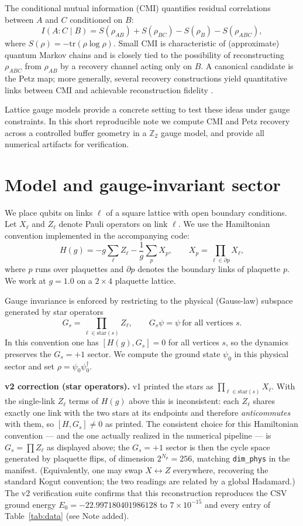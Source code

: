 \documentclass[11pt]{article}
\begin{document}
The conditional mutual information (CMI) quantifies residual
correlations between $A$ and $C$ conditioned on $B$:
\[
I(A : C \mid B) = S(\rho_{AB}) + S(\rho_{BC}) - S(\rho_B) -
S(\rho_{ABC}),
\]
where $S(\rho) = -\mathrm{tr}(\rho\log\rho)$. Small CMI is
characteristic of (approximate) quantum Markov chains and is closely
tied to the possibility of reconstructing $\rho_{ABC}$ from $\rho_{AB}$
by a recovery channel acting only on $B$. A canonical candidate is the
Petz map; more generally, several recovery constructions yield
quantitative links between CMI and achievable reconstruction fidelity
\cite{Petz, FR, SBT}.

Lattice gauge models provide a concrete setting to test these ideas
under gauge constraints. In this short reproducible note we compute CMI
and Petz recovery across a controlled buffer geometry in a
$\mathbb{Z}_2$ gauge model, and provide all numerical artifacts for
verification.

\section{Model and gauge-invariant sector}

We place qubits on links $\ell$ of a square lattice with open boundary
conditions. Let $X_\ell$ and $Z_\ell$ denote Pauli operators on link
$\ell$. We use the Hamiltonian convention implemented in the
accompanying code:
\[
H(g) = -g \sum_\ell Z_\ell - \frac{1}{g} \sum_p X_p, \qquad
X_p = \prod_{\ell \in \partial p} X_\ell,
\]
where $p$ runs over plaquettes and $\partial p$ denotes the boundary
links of plaquette $p$. We work at $g = 1.0$ on a $2\times4$ plaquette
lattice.

Gauge invariance is enforced by restricting to the physical (Gauss-law)
subspace generated by star operators
\[
G_s = \prod_{\ell \in \mathrm{star}(s)} Z_\ell, \qquad G_s\psi = \psi
\ \text{for all vertices } s.
\]
In this convention one has $[H(g), G_s] = 0$ for all vertices $s$, so
the dynamics preserves the $G_s = +1$ sector. We compute the ground
state $\psi_0$ in this physical sector and set $\rho =
\psi_0\psi_0^\dagger$.

\textbf{v2 correction (star operators).} v1 printed the stars as
$\prod_{\ell\in\mathrm{star}(s)} X_\ell$. With the single-link $Z_\ell$
terms of $H(g)$ above this is inconsistent: each $Z_\ell$ shares exactly
one link with the two stars at its endpoints and therefore
\emph{anticommutes} with them, so $[H, G_s] \ne 0$ as printed. The
consistent choice for this Hamiltonian convention --- and the one
actually realized in the numerical pipeline --- is $G_s = \prod Z_\ell$
as displayed above; the $G_s = +1$ sector is then the cycle space
generated by plaquette flips, of dimension $2^{N_p} = 256$, matching
\texttt{dim\_phys} in the manifest. (Equivalently, one may swap $X
\leftrightarrow Z$ everywhere, recovering the standard Kogut convention;
the two readings are related by a global Hadamard.) The v2 verification
suite confirms that this reconstruction reproduces the CSV ground energy
$E_0 = -22.997180401986128$ to $7\times10^{-15}$ and every entry of
Table~\ref{tab:data} (see Note added).
\end{document}
